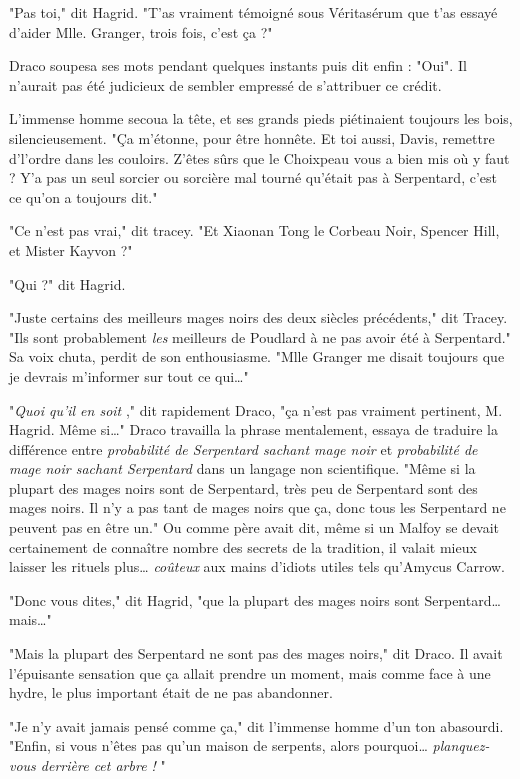 "Pas toi," dit Hagrid. "T'as vraiment témoigné sous Véritasérum que t'as essayé d'aider Mlle. Granger, trois fois, c'est ça ?"

Draco soupesa ses mots pendant quelques instants puis dit enfin : "Oui". Il n'aurait pas été judicieux de sembler empressé de s'attribuer ce crédit.

L'immense homme secoua la tête, et ses grands pieds piétinaient toujours les bois, silencieusement. "Ça m'étonne, pour être honnête. Et toi aussi, Davis, remettre d'l'ordre dans les couloirs. Z'êtes sûrs que le Choixpeau vous a bien mis où y faut ? Y'a pas un seul sorcier ou sorcière mal tourné qu'était pas à Serpentard, c'est ce qu'on a toujours dit."

"Ce n'est pas vrai," dit tracey. "Et Xiaonan Tong le Corbeau Noir, Spencer Hill, et Mister Kayvon ?"

"Qui ?" dit Hagrid.

"Juste certains des meilleurs mages noirs des deux siècles précédents," dit Tracey. "Ils sont probablement \emph{les}  meilleurs de Poudlard à ne pas avoir été à Serpentard." Sa voix chuta, perdit de son enthousiasme. "Mlle Granger me disait toujours que je devrais m'informer sur tout ce qui…"

"\emph{Quoi qu'il en soit} ," dit rapidement Draco, "ça n'est pas vraiment pertinent, M. Hagrid. Même si…" Draco travailla la phrase mentalement, essaya de traduire la différence entre \emph{probabilité de Serpentard sachant mage noir}  et \emph{probabilité de mage noir sachant Serpentard}  dans un langage non scientifique. "Même si la plupart des mages noirs sont de Serpentard, très peu de Serpentard sont des mages noirs. Il n'y a pas tant de mages noirs que ça, donc tous les Serpentard ne peuvent pas en être un." Ou comme père avait dit, même si un Malfoy se devait certainement de connaître nombre des secrets de la tradition, il valait mieux laisser les rituels plus… \emph{coûteux}  aux mains d'idiots utiles tels qu'Amycus Carrow.

"Donc vous dites," dit Hagrid, "que la plupart des mages noirs sont Serpentard… mais…"

"Mais la plupart des Serpentard ne sont pas des mages noirs," dit Draco. Il avait l'épuisante sensation que ça allait prendre un moment, mais comme face à une hydre, le plus important était de ne pas abandonner.

"Je n'y avait jamais pensé comme ça," dit l'immense homme d'un ton abasourdi. "Enfin, si vous n'êtes pas qu'un maison de serpents, alors pourquoi… \emph{planquez-vous derrière cet arbre !} "


